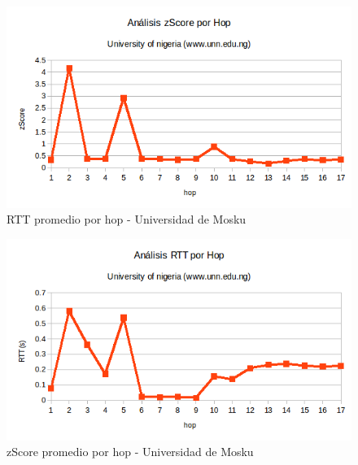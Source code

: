 \begin{figure}[H]
\centering
\includegraphics[width=1\textwidth]{graficos/RTT_rus.png}
\caption{RTT promedio por hop - Universidad de Mosku}
\label{Rus_rtt}
\end{figure}

\begin{figure}[H]
\centering
\includegraphics[width=1\textwidth]{graficos/zScore_rus.png}
\caption{zScore promedio por hop - Universidad de Mosku}
\label{Rus_zs}
\end{figure}

\newpage